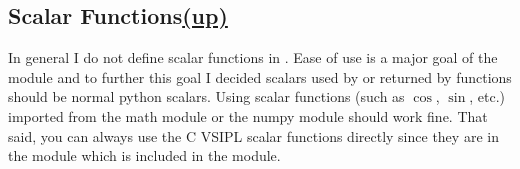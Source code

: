 \subsection*{Scalar Functions\hspace*{\fill}\hyperlink{VSIPspecHead}{(up)}\hypertarget{ScalarFunctions}{}}
In general I do not define scalar functions in \pyjv.  Ease of use is a major goal of the \pyjv{} module and to further this goal I decided scalars used by or returned by \pyjv{} functions should be normal python scalars. Using scalar functions (such as $\cos$, $\sin$, etc.) imported from the math module or the numpy module should work fine. That said, you can always use the C VSIPL scalar functions directly since they are in the  module which is included in the \pyjv{} module.

